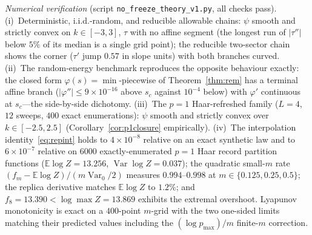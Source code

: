 \documentclass[aps,prx,reprint,superscriptaddress,nobibnotes,longbibliography]{revtex4-2}
\theoremstyle{remark}
\newcommand{\E}{\mathbb E}
\begin{document}
\emph{Numerical verification} (script \texttt{no\_freeze\_theory\_v1.py},
all checks pass).  (i)~Deterministic, i.i.d.-random, and reducible
allowable chains: $\psi$ smooth and strictly convex on
$k\in[-3,3]$, $\tau$ with no affine segment (the longest run of
$|\tau''|$ below $5\%$ of its median is a single grid point); the
reducible two-sector chain shows the corner ($\tau'$ jump $0.57$ in slope
units) with both branches curved.  (ii)~The random-energy benchmark
reproduces the opposite behaviour exactly: the closed form
$\varphi(s)=\min$-piecewise of Theorem~\ref{thm:rem} has a terminal
affine branch ($|\varphi''|\le9\times10^{-16}$ above $s_c$ against
$10^{-4}$ below) with $\varphi'$ continuous at $s_c$---the side-by-side
dichotomy.  (iii)~The $p=1$ Haar-refreshed family ($L=4$, $12$ sweeps,
$400$ exact enumerations): $\psi$ smooth and strictly convex over
$k\in[-2.5,2.5]$ (Corollary~\ref{cor:p1closure} empirically).  (iv)~The
interpolation identity~\eqref{eq:repint} holds to $4\times10^{-8}$
relative on an exact synthetic law and to $6\times10^{-7}$ relative on
$6000$ exactly-enumerated $p=1$ Haar record partition functions
($\E\log Z=13.256$, $\operatorname{Var}\log Z=0.037$); the quadratic small-$m$ rate
$(f_m-\E\log Z)/(m\operatorname{Var}_0/2)$ measures $0.994$--$0.998$ at
$m\in\{0.125,0.25,0.5\}$; the replica derivative matches $\E\log Z$ to
$1.2\%$; and $f_8=13.390<\log\max Z=13.869$ exhibits the extremal
overshoot.  Lyapunov monotonicity is exact on a $400$-point $m$-grid with
the two one-sided limits matching their predicted values including the
$(\log p_{\max})/m$ finite-$m$ correction.
\end{document}
